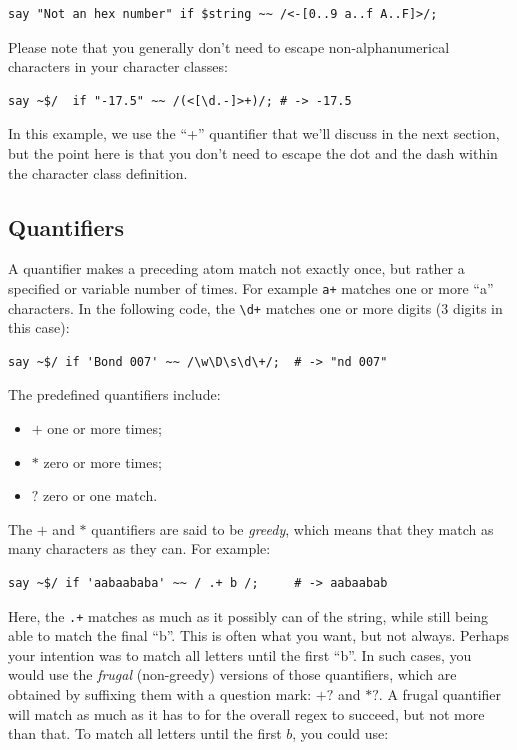 \begin{verbatim}
say "Not an hex number" if $string ~~ /<-[0..9 a..f A..F]>/;
\end{verbatim}

Please note that you generally don't need to escape 
non-alphanumerical characters in your character classes:

\begin{verbatim}
say ~$/  if "-17.5" ~~ /(<[\d.-]>+)/; # -> -17.5
\end{verbatim}

In this example, we use the ``+'' quantifier that we'll discuss 
in the next section, but the point here is that you don't need 
to escape the dot and the dash within the character class 
definition.

\subsection{Quantifiers}

A quantifier makes a preceding atom match not exactly once, 
but rather a specified or variable number of times. For 
example \verb'a+' matches one or more ``a'' characters. In 
the following code, the \verb'\d+' matches one or more 
digits (3 digits in this case):

\begin{verbatim}
say ~$/ if 'Bond 007' ~~ /\w\D\s\d\+/;  # -> "nd 007"
\end{verbatim}
%

The predefined quantifiers include:
\begin{itemize}
\item $+$ one or more times;
\item $*$ zero or more times;
\item $?$ zero or one match.
\end{itemize}

The $+$ and $*$ quantifiers are said to be \emph{greedy}, 
which means that they match as many characters as they 
can. For example:

\begin{verbatim}
say ~$/ if 'aabaababa' ~~ / .+ b /;     # -> aabaabab
\end{verbatim}
%

Here, the \verb'.+' matches as much as it possibly can 
of the string, while still being able to match the final ``b''. 
This is often what you want, but not always. Perhaps your 
intention was to match all letters until the first ``b''. In 
such cases, you would use the \emph{frugal} (non-greedy) 
versions of those quantifiers, which are obtained by suffixing 
them with a question mark: $+?$ and $*?$. A frugal quantifier 
will match as much as it has to for the overall regex to succeed, 
but not more than that. To match all letters until the first $b$, 
you could use:

